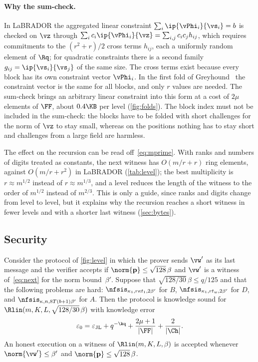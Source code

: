 \paragraph{Why the sum-check.}
In LaBRADOR the aggregated linear constraint $\sum_i\ip{\vPhi_i}{\vs_i}=b$ is checked on $\vz$ through $\sum_ic_i\ip{\vPhi_i}{\vz}=\sum_{i,j}c_ic_jh_{ij}$, which requires commitments to the $(r^2+r)/2$ cross terms $h_{ij}$, each a uniformly random element of $\Rq$; for quadratic constraints there is a second family $g_{ij}=\ip{\vs_i}{\vs_j}$ of the same size. The cross terms exist because every block has its own constraint vector $\vPhi_i$. In the first fold of Greyhound~\cite{NS24} the constraint vector is the same for all blocks, and only $r$ values are needed. The sum-check brings an arbitrary linear constraint into this form at a cost of $2\mu$ elements of $\FF$, about $0.4\KB$ per level (\cref{fig:folds}). The block index must not be included in the sum-check: the blocks have to be folded with short challenges for the norm of $\vz$ to stay small, whereas on the positions nothing has to stay short and challenges from a large field are harmless.

The effect on the recursion can be read off~\eqref{eq:mprime}. With ranks and numbers of digits treated as constants, the next witness has $O(m/r+r)$ ring elements, against $O(m/r+r^2)$ in LaBRADOR (\cref{tab:level}); the best multiplicity is $r\approx m^{1/2}$ instead of $r\approx m^{1/3}$, and a level reduces the length of the witness to the order of $m^{1/2}$ instead of $m^{2/3}$. This is only a guide, since ranks and digits change from level to level, but it explains why the recursion reaches a short witness in fewer levels and with a shorter last witness (\cref{sec:bytes}).

\subsection{Security}

\begin{theorem}\label{thm:level}
Consider the protocol of \cref{fig:level} in which the prover sends $\vw'$ as its last message and the verifier accepts if $\norm{\mathbf p}\le\sqrt{128}\,\beta$ and $\vw'$ is a witness of~\eqref{eq:next} for the norm bound~$\beta'$. Suppose that $\sqrt{128/30}\,\beta\le q/125$ and that the following problems are hard: $\nfsis_{\kappa_1,r\kappa t_1,2\beta'}$ for $B$, $\nfsis_{\kappa_1,rt_w,2\beta'}$ for $D$, and $\nfsis_{\kappa,n,8T(b+1)\beta'}$ for $A$. Then the protocol is knowledge sound for $\Rlin(m,K,L,\sqrt{128/30}\,\beta)$ with knowledge error
\[
\varepsilon_0=\varepsilon_{\mathrm{JL}}+q^{-\kq}+\frac{2\mu+1}{\lvert\FF\rvert}+\frac{2}{\lvert\Ch\rvert} .
\]
An honest execution on a witness of $\Rlin(m,K,L,\beta)$ is accepted whenever $\norm{\vw'}\le\beta'$ and $\norm{\mathbf p}\le\sqrt{128}\,\beta$.
\end{theorem}

